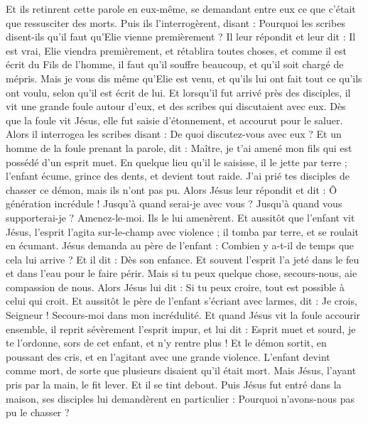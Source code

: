 \begin{multicols}{2}
Et ils retinrent cette parole en eux-même, se demandant entre eux ce que c'était que ressusciter des morts.
Puis ils l'interrogèrent, disant : Pourquoi les scribes disent-ils qu'il faut qu'Elie vienne premièrement ?
Il leur répondit et leur dit : Il est vrai, Elie viendra premièrement, et rétablira toutes choses, et comme il est écrit du Fils de l’homme, il faut qu’il souffre beaucoup, et qu’il soit chargé de mépris.
Mais je vous dis même qu’Elie est venu, et qu'ils lui ont fait tout ce qu’ils ont voulu, selon qu’il est écrit de lui.
Et lorsqu’il fut arrivé près des disciples, il vit une grande foule autour d’eux, et des scribes qui discutaient avec eux.
Dès que la foule vit Jésus, elle fut saisie d'étonnement, et accourut pour le saluer.
Alors il interrogea les scribes disant : De quoi discutez-vous avec eux ?
Et un homme de la foule prenant la parole, dit : Maître, je t'ai amené mon fils qui est possédé d’un esprit muet.
En quelque lieu qu’il le saisisse, il le jette par terre ; l’enfant écume, grince des dents, et devient tout raide. J’ai prié tes disciples de chasser ce démon, mais ils n'ont pas pu.
Alors Jésus leur répondit et dit : Ô génération incrédule ! Jusqu’à quand serai-je avec vous ? Jusqu’à quand vous supporterai-je ? Amenez-le-moi. Ils le lui amenèrent.
Et aussitôt que l’enfant vit Jésus, l'esprit l'agita sur-le-champ avec violence ; il tomba par terre, et se roulait en écumant.
Jésus demanda au père de l'enfant : Combien y a-t-il de temps que cela lui arrive ? Et il dit : Dès son enfance.
Et souvent l’esprit l’a jeté dans le feu et dans l'eau pour le faire périr. Mais si tu peux quelque chose, secours-nous, aie compassion de nous.
Alors Jésus lui dit : Si tu peux croire, tout est possible à celui qui croit.
Et aussitôt le père de l'enfant s'écriant avec larmes, dit : Je crois, Seigneur ! Secours-moi dans mon incrédulité.
Et quand Jésus vit la foule accourir ensemble, il reprit sévèrement l’esprit impur, et lui dit : Esprit muet et sourd, je te l’ordonne, sors de cet enfant, et n'y rentre plus !
Et le démon sortit, en poussant des cris, et en l’agitant avec une grande violence. L’enfant devint comme mort, de sorte que plusieurs disaient qu’il était mort.
Mais Jésus, l'ayant pris par la main, le fit lever. Et il se tint debout.
Puis Jésus fut entré dans la maison, ses disciples lui demandèrent en particulier : Pourquoi n’avons-nous pas pu le chasser ?

\end{multicols}
